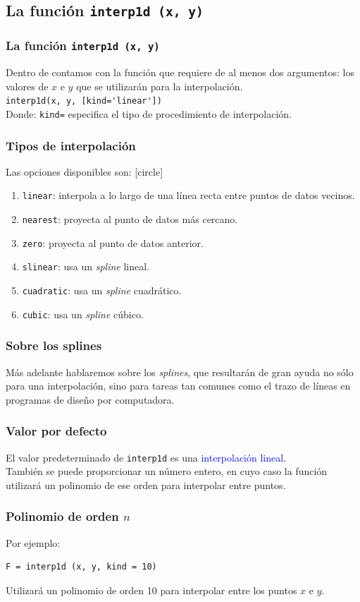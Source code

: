 \subsection{La función \texttt{interp1d (x, y)}}
\begin{frame}[fragile]
\frametitle{La función \texttt{interp1d (x, y)}}
Dentro de  contamos con la función  que requiere de al menos dos argumentos: los valores de $x$ e $y$ que se utilizarán para la interpolación.
\\
\bigskip
\verb|interp1d(x, y, [kind='linear'])|
\\
\bigskip
Donde: \texttt{kind=} especifica el tipo de procedimiento de interpolación.
\end{frame}
\begin{frame}
\frametitle{Tipos de interpolación}
Las opciones disponibles son:
[circle]
\begin{enumerate}[<+->]
\item \texttt{linear}: interpola a lo largo de una línea recta entre puntos de datos vecinos.
\item \texttt{nearest}: proyecta al punto de datos más cercano.
\item \texttt{zero}: proyecta al punto de datos anterior.
\item \texttt{slinear}: usa un \emph{spline} lineal.
\item \texttt{cuadratic}: usa un \emph{spline} cuadrático.
\item \texttt{cubic}: usa un \emph{spline} cúbico.
\end{enumerate}
\end{frame}
\begin{frame}
\frametitle{Sobre los splines}
Más adelante hablaremos sobre los \emph{splines}, que resultarán de gran ayuda no sólo para una interpolación, sino para tareas tan comunes como el trazo de líneas en programas de diseño por computadora.
\end{frame}
\begin{frame}[fragile]
\frametitle{Valor por defecto}
El valor predeterminado de \texttt{interp1d} es una \textcolor{blue}{interpolación lineal}.
\\
\bigskip
También se puede proporcionar un número entero, en cuyo caso la función utilizará un polinomio de ese orden para interpolar entre puntos.
\end{frame}
\begin{frame}[fragile]
\frametitle{Polinomio de orden $n$}
Por ejemplo:
\begin{verbatim}
F = interp1d (x, y, kind = 10)
\end{verbatim}
Utilizará un polinomio de orden 10 para interpolar entre los puntos $x$ e $y$.
\end{frame}

